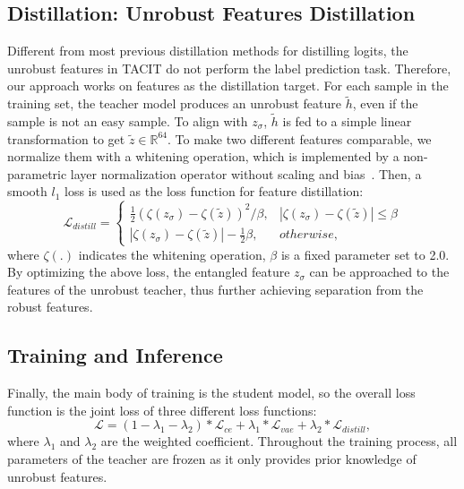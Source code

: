 \documentclass[letterpaper]{article} %
\begin{document}
\subsection{Distillation: Unrobust Features Distillation}
Different from most previous distillation methods for distilling logits, the unrobust features in TACIT do not perform the label prediction task. Therefore, our approach works on features as the distillation target. For each sample in the training set, the teacher model produces an unrobust feature $\tilde{h}$, even if the sample is not an easy sample. To align with $z_\sigma$, $\tilde{h}$ is fed to a simple linear transformation to get $\tilde{z} \in \mathbb{R}^{64}$. To make two different features comparable, we normalize them with a whitening operation, which is implemented by a non-parametric layer normalization operator without scaling and bias~\cite{Yixuan2022}. Then, a smooth $l_1$ loss is used as the loss function for feature distillation:
\begin{equation}
	\mathcal{L}_{distill} = \left\{
	\begin{array}{ll}
		\frac{1}{2}(\mathcal{\zeta}(z_\sigma)-\mathcal{\zeta}(\tilde{z}))^2/\beta, & |\mathcal{\zeta}(z_\sigma)-\mathcal{\zeta}(\tilde{z})|\leq \beta  \\
		|\mathcal{\zeta}(z_\sigma)-\mathcal{\zeta}(\tilde{z})| - \frac{1}{2}\beta, & otherwise, 
	\end{array} \right.
\end{equation}
where $\zeta(.)$ indicates the whitening operation, $\beta$ is a fixed parameter set to 2.0. By optimizing the above loss, the entangled feature $z_\sigma$ can be approached to the features of the unrobust teacher, thus further achieving separation from the robust features.

\subsection{Training and Inference}
Finally, the main body of training is the student model, so the overall loss function is the joint loss of three different loss functions:
\begin{equation}
	\mathcal{L} = (1-\lambda_1-\lambda_2)*\mathcal{L}_{ce} + \lambda_1*\mathcal{L}_{vae} + \lambda_2*\mathcal{L}_{distill},
\end{equation}
where $\lambda_1$ and $\lambda_2$ are the weighted coefficient. Throughout the training process, all parameters of the teacher are frozen as it only provides prior knowledge of unrobust features. 
\end{document}
